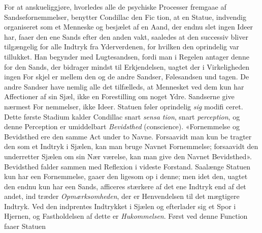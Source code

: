 \documentclass[12pt,a4paper]{book}
\begin{document}
For at anskueliggjøre, hvorledes alle de psychiske Processer
fremgaae af Sandsefornemmelser, benytter Condillac den Fic\-%
tion, at en Statue, indvendig organiseret som et Menneske og
besjælet af en Aand, der endnu slet ingen Ideer har, faaer
den ene Sands efter den anden vakt, saaledes at den successiv
bliver tilgængelig for alle Indtryk fra Yderverdenen, for hvilken
den oprindelig var tillukket. Han begynder med Lugtesandsen,
fordi man i Regelen antager denne for den Sands, der bidrager
mindst til Erkjendelsen, uagtet der i Virkeligheden ingen For\-%
skjel er mellem den og de andre Sandser, Følesandsen und\-%
tagen. De andre Sandser have nemlig alle det tilfælleds, at
Mennesket ved dem kun har Affectioner af sin Sjæl, ikke en
Forestilling om noget Ydre. Sandserne give nærmest For\-%
nemmelser, ikke Ideer. Statuen føler oprindelig \emph{sig} modifi\-%
ceret. Dette første Stadium kalder Condillac snart \emph{sensa\-%
tion}, snart \emph{perception}, og denne Perception er umiddelbart
\emph{Bevidsthed} (conscience). «Fornemmelse og Bevidsthed ere
den samme Act under to Navne. Forsaavidt man kun be\-%
tragter den som et Indtryk i Sjælen, kan man bruge Navnet
Fornemmelse; forsaavidt den underretter Sjælen om sin Nær\-%
værelse, kan man give den Navnet Bevidsthed». Bevidsthed
falder sammen med Reflexion i videste Forstand. Saalænge
Statuen kun har een Fornemmelse, gaaer den ligesom op i
denne; men idet den, uagtet den endnu kun har een Sands,
afficeres stærkere af det ene Indtryk end af det andet, ind\-%
træder \emph{Opmærksomheden}, der er Henvendelsen til det
mægtigere Indtryk. Ved den indprentes Indtrykket i Sjælen og
efterlader sig et Spor i Hjernen, og Fastholdelsen af dette er
\emph{Hukommelsen}. Først ved denne Function faaer Statuen
\end{document}

